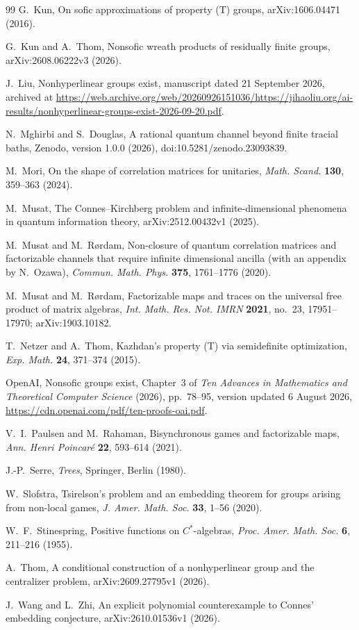 \documentclass[11pt]{article}
\begin{document}
\begin{thebibliography}{99}
G.~Kun,
On sofic approximations of property (T) groups,
arXiv:1606.04471 (2016).

G.~Kun and A.~Thom,
Nonsofic wreath products of residually finite groups,
arXiv:2608.06222v3 (2026).

J.~Liu,
Nonhyperlinear groups exist,
manuscript dated 21 September 2026, archived at \url{https://web.archive.org/web/20260926151036/https://jihaoliu.org/ai-results/nonhyperlinear-groups-exist-2026-09-20.pdf}.

N.~Mghirbi and S.~Douglas,
A rational quantum channel beyond finite tracial baths,
Zenodo, version 1.0.0 (2026), doi:10.5281/zenodo.23093839.

M.~Mori,
On the shape of correlation matrices for unitaries,
\emph{Math. Scand.} \textbf{130}, 359--363 (2024).

M.~Musat,
The Connes--Kirchberg problem and infinite-dimensional phenomena in quantum information theory,
arXiv:2512.00432v1 (2025).

M.~Musat and M.~R\o rdam,
Non-closure of quantum correlation matrices and factorizable channels that require infinite dimensional ancilla (with an appendix by N.~Ozawa),
\emph{Commun. Math. Phys.} \textbf{375}, 1761--1776 (2020).

M.~Musat and M.~R\o rdam,
Factorizable maps and traces on the universal free product of matrix algebras,
\emph{Int. Math. Res. Not. IMRN} \textbf{2021}, no.~23, 17951--17970; arXiv:1903.10182.

T.~Netzer and A.~Thom,
Kazhdan's property (T) via semidefinite optimization,
\emph{Exp. Math.} \textbf{24}, 371--374 (2015).

OpenAI,
Nonsofic groups exist,
Chapter~3 of \emph{Ten Advances in Mathematics and Theoretical Computer Science} (2026), pp.~78--95, version updated 6 August 2026, \url{https://cdn.openai.com/pdf/ten-proofs-oai.pdf}.

V.~I.~Paulsen and M.~Rahaman,
Bisynchronous games and factorizable maps,
\emph{Ann. Henri Poincar\'e} \textbf{22}, 593--614 (2021).

J.-P.~Serre,
\emph{Trees},
Springer, Berlin (1980).

W.~Slofstra,
Tsirelson's problem and an embedding theorem for groups arising from non-local games,
\emph{J. Amer. Math. Soc.} \textbf{33}, 1--56 (2020).

W.~F.~Stinespring,
Positive functions on $C^*$-algebras,
\emph{Proc. Amer. Math. Soc.} \textbf{6}, 211--216 (1955).

A.~Thom,
A conditional construction of a nonhyperlinear group and the centralizer problem,
arXiv:2609.27795v1 (2026).

J.~Wang and L.~Zhi,
An explicit polynomial counterexample to Connes' embedding conjecture,
arXiv:2610.01536v1 (2026).

\end{thebibliography}
\end{document}
